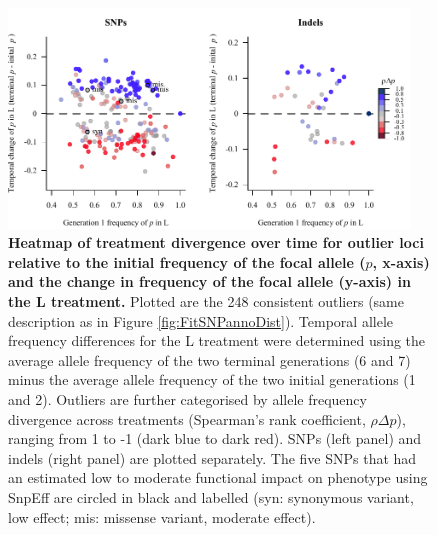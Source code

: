 \newpage
\FloatBarrier
\bigskip
\begin{figure}[!h]
    \centering
    \includegraphics[width=0.95\textwidth]{Chp4_DNA/2023_Gen1_LvsDiff_L_2.pdf}
\caption[Heatmap of treatment divergence over time for outlier loci relative to the initial frequency of the focal allele ($p$, x-axis) and the change in frequency of the focal allele (y-axis) in the L treatment.]{\textbf{Heatmap of treatment divergence over time for outlier loci relative to the initial frequency of the focal allele ($p$, x-axis) and the change in frequency of the focal allele (y-axis) in the L treatment.} Plotted are the 248 consistent outliers (same description as in Figure \ref{fig:FitSNPannoDist}). Temporal allele frequency differences for the L treatment were determined using the average allele frequency of the two terminal generations (6 and 7) minus the average allele frequency of the two initial generations (1 and 2). Outliers are further categorised by allele frequency divergence across treatments (Spearman’s rank coefficient, $\rho\Delta p$), ranging from 1 to -1 (dark blue to dark red). SNPs (left panel) and indels (right panel) are plotted separately. The five SNPs that had an estimated low to moderate functional impact on phenotype using SnpEff are circled in black and labelled (syn: synonymous variant, low effect; mis: missense variant, moderate effect).}
    \label{fig:FitHeatmapDeltap}
\end{figure}

\FloatBarrier



